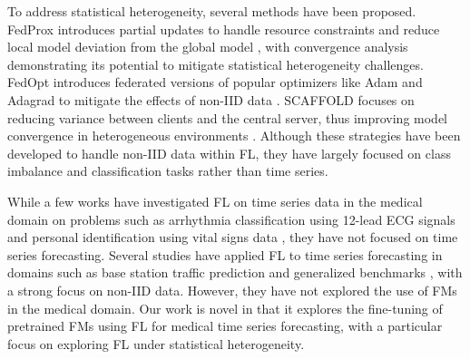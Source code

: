
To address statistical heterogeneity, several methods have been proposed. 
FedProx introduces partial updates to handle resource constraints and reduce local model deviation from the global model \cite{fedprox}, with convergence analysis demonstrating its potential to mitigate statistical heterogeneity challenges.
FedOpt introduces federated versions of popular optimizers like Adam and Adagrad to mitigate the effects of non-IID data \cite{fedopt}. 
SCAFFOLD focuses on reducing variance between clients and the central server, thus improving model convergence in heterogeneous environments \cite{scaffold}.
Although these strategies have been developed to handle non-IID data within FL, they have largely focused on class imbalance and classification tasks rather than time series.

While a few works have investigated FL on time series data in the medical domain on problems such as arrhythmia classification using 12-lead ECG signals  \cite{10301542} and personal identification using vital signs data \cite{10.1007/978-3-031-49361-4_3}, they have not focused on time series forecasting. 
Several studies have applied FL to time series forecasting in domains such as base station traffic prediction \cite{PERIFANIS2023109950} and generalized benchmarks \cite{yuan2024tacklingdataheterogeneityfederated}, with a strong focus on non-IID data. 
However, they have not explored the use of FMs in the medical domain.
Our work is novel in that it explores the fine-tuning of pretrained FMs using FL for medical time series forecasting, with a particular focus on exploring FL under statistical heterogeneity.
